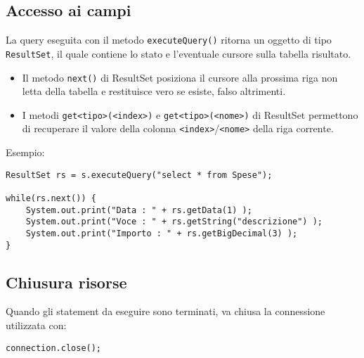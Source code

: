 \documentclass[a4paper, 10pt, titlepage]{article}
\begin{document}
\subsection{Accesso ai campi}
La query eseguita con il metodo \lstinline|executeQuery()| ritorna un oggetto di tipo \lstinline|ResultSet|, il quale contiene lo stato e l'eventuale cursore sulla tabella risultato.
\begin{itemize}
\item Il metodo \lstinline|next()| di ResultSet posiziona il cursore alla prossima riga non letta della tabella e restituisce vero se esiste, falso altrimenti.
\item I metodi \lstinline|get<tipo>(<index>)| e \lstinline|get<tipo>(<nome>)| di ResultSet permettono di recuperare il valore della colonna \lstinline|<index>|/\lstinline|<nome>| della riga corrente.
\end{itemize}
Esempio:
\begin{lstlisting}
ResultSet rs = s.executeQuery("select * from Spese");

while(rs.next()) {
	System.out.print("Data : " + rs.getData(1) );
	System.out.print("Voce : " + rs.getString("descrizione") );
	System.out.print("Importo : " + rs.getBigDecimal(3) );
}
\end{lstlisting}

\subsection{Chiusura risorse}
Quando gli statement da eseguire sono terminati, va chiusa la connessione utilizzata con:
\begin{lstlisting}
connection.close();
\end{lstlisting}
\end{document}
